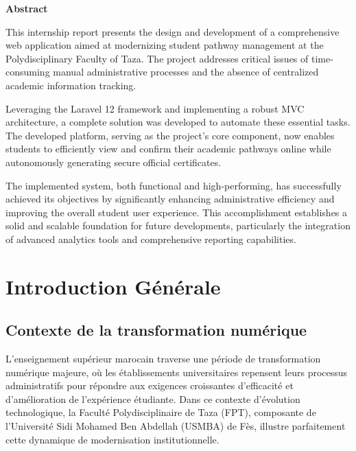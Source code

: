 \documentclass[12pt,a4paper]{report}
\begin{document}
\vspace{2cm} %

\begin{center}
    \textbf{Abstract}
\end{center}

This internship report presents the design and development of a comprehensive web application aimed at modernizing student pathway management at the Polydisciplinary Faculty of Taza. The project addresses critical issues of time-consuming manual administrative processes and the absence of centralized academic information tracking.

Leveraging the Laravel 12 framework and implementing a robust MVC architecture, a complete solution was developed to automate these essential tasks. The developed platform, serving as the project's core component, now enables students to efficiently view and confirm their academic pathways online while autonomously generating secure official certificates.

The implemented system, both functional and high-performing, has successfully achieved its objectives by significantly enhancing administrative efficiency and improving the overall student user experience. This accomplishment establishes a solid and scalable foundation for future developments, particularly the integration of advanced analytics tools and comprehensive reporting capabilities.

\newpage




















\newpage

\chapter*{Introduction Générale}

\section*{Contexte de la transformation numérique}
L'enseignement supérieur marocain traverse une période de transformation numérique majeure, où les établissements universitaires repensent leurs processus administratifs pour répondre aux exigences croissantes d'efficacité et d'amélioration de l'expérience étudiante. Dans ce contexte d'évolution technologique, la Faculté Polydisciplinaire de Taza (FPT), composante de l'Université Sidi Mohamed Ben Abdellah (USMBA) de Fès, illustre parfaitement cette dynamique de modernisation institutionnelle.
\end{document}
